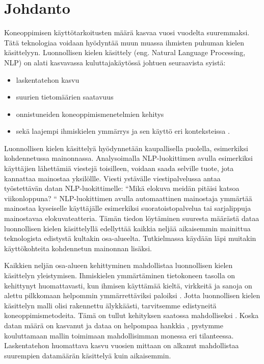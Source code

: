 \chapter{Johdanto\label{intro}}

Koneoppimisen käyttötarkoitusten määrä kasvaa vuosi vuodelta suuremmaksi. Tätä teknologiaa voidaan hyödyntää muun muassa ihmisten puhuman kielen käsittelyyn. Luonnollisen kielen käsittely (eng. Natural Language Processing, NLP) on alati kasvavassa kuluttajakäytössä johtuen seuraavista syistä:
\begin{itemize}
  \item laskentatehon kasvu
  \item suurien tietomäärien saatavuus
  \item onnistuneiden koneoppimismenetelmien kehitys
  \item sekä laajempi ihmiskielen ymmärrys ja sen käyttö eri konteksteissa \citep{doi:10.1126/science.aaa8685}.
\end{itemize}

Luonnollisen kielen käsittelyä hyödynnetään kaupallisella puolella, esimerkiksi kohdennetussa mainonnassa. Analysoimalla NLP-luokittimen avulla esimerkiksi käyttäjien lähettämiä viestejä toisilleen, voidaan saada selville tuote, jota kannattaa mainostaa yksilöllle. Viesti ystävälle viestipalvelussa antaa työstettävän datan NLP-luokittimelle: ``Mikä elokuva meidän pitäisi katsoa viikonloppuna? `` NLP-luokittimen avulla automaattinen mainostaja ymmärtää mainostaa kyseiselle käyttäjälle esimerkiksi suoratoistopalvelua tai sarjalippuja mainostavaa elokuvateatteria. Tämän tiedon löytäminen suuresta määrästä dataa luonnollisen kielen käsittelyllä edellyttää kaikkia neljää aikaisemmin mainittua teknologista edistystä kultakin osa-alueelta. Tutkielmassa käydään läpi muitakin käyttökohteita kohdennetun mainonnan lisäksi.

Kaikkien neljän osa-alueen kehittyminen mahdollistaa luonnollisen kielen käsittelyn yleistymisen. Ihmiskielen ymmärtäminen tietokoneen tasolla on kehittynyt huomattavasti, kun ihmisen käyttämää kieltä, virkkeitä ja sanoja on alettu pilkkomaan helpommin ymmärrettäviksi paloiksi \citep{https://doi.org/10.1002/aris.1440370103}. Jotta luonnollisen kielen käsittelyn malli olisi rakennettu älykkäästi, tarvitsemme edistyneitä koneoppimismetodeita. Tämä on tullut kehityksen saatossa mahdolliseksi \citep{jordan2015machine}. Koska datan määrä on kasvanut ja dataa on helpompaa hankkia \citep{gopalakrishnan2018deep}, pystymme kouluttamaan mallin toimimaan mahdollisimman monessa eri tilanteessa. Laskentatehon huomattava kasvu vuosien mittaan \citep{moore1965cramming} on alkanut mahdollistaa suurempien datamäärän käsittelyä kuin aikaisemmin.


